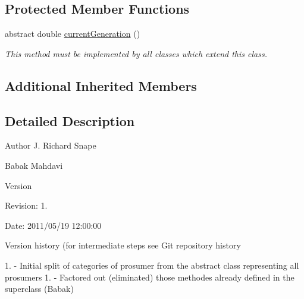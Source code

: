 \subsection*{Protected Member Functions}
\begin{DoxyCompactItemize}
\item 
abstract double \hyperlink{classuk_1_1ac_1_1dmu_1_1iesd_1_1cascade_1_1agents_1_1prosumers_1_1_generator_prosumer_accd68a00d4d869913991c7dfe1015c6b}{current\-Generation} ()
\begin{DoxyCompactList}\small\item\em This method must be implemented by all classes which extend this class. \end{DoxyCompactList}\end{DoxyCompactItemize}
\subsection*{Additional Inherited Members}


\subsection{Detailed Description}
\begin{DoxyAuthor}{Author}
J. Richard Snape 

Babak Mahdavi
\end{DoxyAuthor}
\begin{DoxyVersion}{Version}

\end{DoxyVersion}
\begin{DoxyParagraph}{Revision\-:}
1. 
\end{DoxyParagraph}
\begin{DoxyParagraph}{Date\-:}
2011/05/19 12\-:00\-:00 
\end{DoxyParagraph}


Version history (for intermediate steps see Git repository history

1. -\/ Initial split of categories of prosumer from the abstract class representing all prosumers 1. -\/ Factored out (eliminated) those methodes already defined in the superclass (Babak) 

